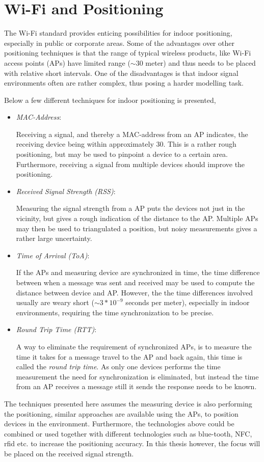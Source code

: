\documentclass{LTHthesis}
\begin{document}
\section{Wi-Fi and Positioning}
%
The Wi-Fi standard provides enticing possibilities for indoor positioning, especially in public or corporate areas. Some of the advantages over other positioning techniques is that the range of typical wireless products, like Wi-Fi access points (APs) have limited range ($\sim 30$ meter) and thus needs to be placed with relative short intervals. One of the disadvantages is that indoor signal environments often are rather complex, thus posing a harder modelling task.

Below a few different techniques for indoor positioning is presented, 
%
\begin{itemize}
\item \emph{MAC-Address}:  

Receiving a signal, and thereby a MAC-address from an AP indicates, the receiving device being  within approximately $30$. This is a rather rough positioning, but may be used to pinpoint a device to a certain area. Furthermore, receiving a signal from multiple devices should improve the positioning. 
%
\item \emph{Received Signal Strength (RSS)}:

Measuring the signal strength from a AP puts the devices not just in the vicinity, but gives a rough indication of the distance to the AP. Multiple APs may then be used to triangulated a position, but noisy measurements gives a rather large uncertainty. 
%
\item \emph{Time of Arrival (ToA)}:

If the APs and measuring device are synchronized in time, the time difference between when a message was sent and received may be used to compute the distance between device and AP. However, the the time differences involved usually are weary short ($\sim 3*10^{-9}$ seconds per meter), especially in indoor environments, requiring the time synchronization to be precise.  
%
\item \emph{Round Trip Time (RTT)}: 

A way to eliminate the requirement of synchronized APs, is to measure the time it takes for a message travel to the AP and back again, this time is called the \emph{round trip time}. As only one devices performs the time measurement the need for synchronization is eliminated, but instead the time from an AP receives a message still it sends the response needs to be known.
%
\end{itemize}
%
The techniques presented here assumes the measuring device is also performing the positioning, similar approaches are available using the APs, to position devices in the environment. Furthermore, the technologies above could be combined or used together with different technologies such as blue-tooth, NFC, rfid etc. to increase the positioning accuracy. 
In this thesis however,  the focus will be placed on the received signal strength.
%
\end{document}

